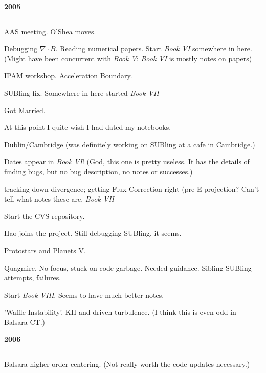 \documentclass[10pt]{article}
\begin{document}
\begin{center}{\bf 2005}\end{center}

\noindent\rule[3pt]{\textwidth}{.1mm}

 AAS meeting.  O'Shea moves.  

 Debugging $\nabla \cdot B$.  Reading numerical papers. Start \emph{Book VI} somewhere in here.  (Might have been
concurrent with \emph{Book V}: \emph{Book VI} is mostly notes on papers)

 IPAM workshop.  Acceleration Boundary.

 SUBling fix.  Somewhere in here started \emph{Book VII}

 Got Married.

At this point I quite wish I had dated my notebooks.

 Dublin/Cambridge (was definitely working on SUBling at a
cafe in Cambridge.)


 Dates appear in \emph{Book VI}!  (God, this one is pretty
useless.  It has the details of finding bugs, but no bug description, no notes
or successes.)

tracking down divergence; getting Flux Correction right (pre E projection? Can't
tell what notes these are. \emph{Book VII}

 Start the CVS repository.

 Hao joins the project.  Still debugging SUBling, it seems.  

 Protostars and Planets V.


 Quagmire.  No focus, stuck on code garbage.  Needed guidance.
Sibling-SUBling attempts, failures.  

 Start \emph{Book VIII}.  Seems to have much better notes.

 'Waffle Instability'.  KH and driven turbulence.  (I think this
is even-odd in Balsara CT.)

\begin{center}{\bf 2006}\end{center}

\noindent\rule[3pt]{\textwidth}{.1mm}

 Balsara higher order centering.  (Not really worth the code updates
necessary.)
\end{document}
